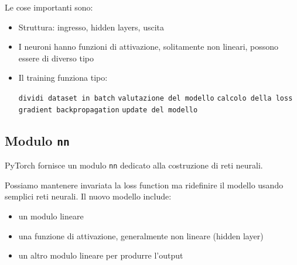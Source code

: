 Le cose importanti sono: 
\begin{itemize}
    \item Struttura: ingresso, hidden layers, uscita
    
    \item I neuroni hanno funzioni di attivazione, solitamente non lineari, possono essere di diverso tipo
    
    \item Il training funziona tipo:
    \begin{center}
        \begin{minipage}{.9\textwidth}
            \begin{tcolorbox}[
                colback=white,
                sharp corners,
                boxrule=.3mm,
                left=20pt,
                top=0pt,
                bottom=0pt,
                colbacktitle=white,
                coltitle=black
                ]
                \begin{algorithm}[H]
                    \caption{Training Process}
                    \begin{algorithmic}[1]
                            \State \texttt{dividi dataset in batch}
                                    \State \texttt{valutazione del modello}
                                    \State \texttt{calcolo della loss}
                                    \State \texttt{gradient backpropagation}
                                \EndFor
                                \State \texttt{update del modello}
                            \EndFor
                        \EndFor
                    \end{algorithmic}
                \end{algorithm}
            \end{tcolorbox}
        \end{minipage}
    \end{center}
\end{itemize}

\subsection{Modulo \texttt{nn}}

PyTorch fornisce un modulo \texttt{nn} dedicato alla costruzione di reti neurali.

Possiamo mantenere invariata la loss function ma ridefinire il modello usando semplici reti neurali. Il nuovo modello include: 
\begin{itemize}
    \item un modulo lineare
    
    \item una funzione di attivazione, generalmente non lineare (hidden layer)
    
    \item un altro modulo lineare per produrre l'output
\end{itemize}

